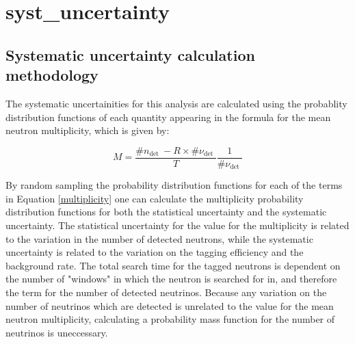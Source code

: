 \chapter{syst_uncertainty}
\label{chp:syst}



\section{Systematic uncertainty calculation methodology}


The systematic uncertainities for this analysis are calculated using the probablity distribution functions of each quantity appearing in the formula for the mean neutron multiplicity, which is given by:

\begin{equation}
    M=\frac{\# n_{\text {det }}-R \times \# \nu_{\text {det }}}{T} \frac{1}{\# \nu_{\text {det }}}
 \label{multiplicity}
\end{equation}



By random sampling the probability distribution functions for each of the terms in Equation \eqref{multiplicity} one can calculate the multiplicity probability distribution functions for both the statistical uncertainty and the systematic uncertainty. The statistical uncertainty for the value for the multiplicity is related to the variation in the number of detected neutrons, while the systematic uncertainty is related to the variation on the tagging efficiency and the background rate. The total search time for the tagged neutrons is dependent on the number of "windows" in which the neutron is searched for in, and therefore the term for the number of detected neutrinos. Because any variation on the number of neutrinos which are detected is unrelated to the value for the mean neutron multiplicity, calculating a probability mass function for the number of neutrinos is uneccessary. 

